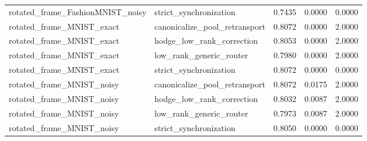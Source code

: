 \begin{table}[t]
\begin{tabular}{lllll}
rotated\_frame\_FashionMNIST\_noisy & strict\_synchronization & 0.7435 & 0.0000 & 0.0000 \\
rotated\_frame\_MNIST\_exact & canonicalize\_pool\_retransport & 0.8072 & 0.0000 & 2.0000 \\
rotated\_frame\_MNIST\_exact & hodge\_low\_rank\_correction & 0.8053 & 0.0000 & 2.0000 \\
rotated\_frame\_MNIST\_exact & low\_rank\_generic\_router & 0.7980 & 0.0000 & 2.0000 \\
rotated\_frame\_MNIST\_exact & strict\_synchronization & 0.8072 & 0.0000 & 0.0000 \\
rotated\_frame\_MNIST\_noisy & canonicalize\_pool\_retransport & 0.8072 & 0.0175 & 2.0000 \\
rotated\_frame\_MNIST\_noisy & hodge\_low\_rank\_correction & 0.8032 & 0.0087 & 2.0000 \\
rotated\_frame\_MNIST\_noisy & low\_rank\_generic\_router & 0.7973 & 0.0087 & 2.0000 \\
rotated\_frame\_MNIST\_noisy & strict\_synchronization & 0.8050 & 0.0000 & 0.0000 \\
\bottomrule
\end{tabular}
\end{table}
